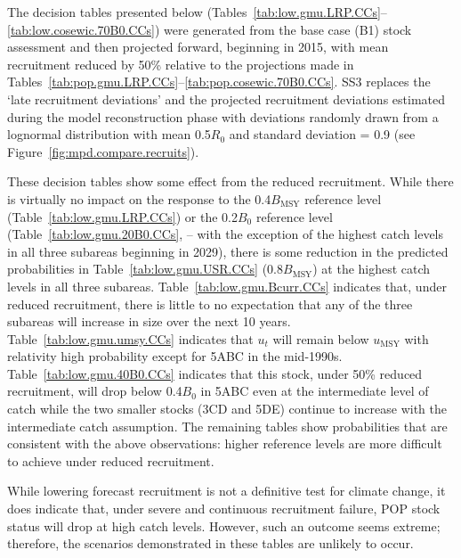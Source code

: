 \documentclass[11pt]{book}
\newcommand{\Bmsy}{B_\text{MSY}}
\newcommand{\umsy}{u_\text{MSY}}
\newcommand{\pc}{\%}
\begin{document}
The decision tables presented below (Tables~\ref{tab:low.gmu.LRP.CCs}--\ref{tab:low.cosewic.70B0.CCs}) were generated from the base case (B1) stock assessment and then projected forward, beginning in 2015, with mean recruitment reduced by 50\pc{} relative to the projections made in Tables~\ref{tab:pop.gmu.LRP.CCs}--\ref{tab:pop.cosewic.70B0.CCs}. 
SS3 replaces the `late recruitment deviations' and the projected recruitment deviations estimated during the model reconstruction phase with deviations randomly drawn from a lognormal distribution with mean 0.5$R_0$ and standard deviation = 0.9 (see Figure~\ref{fig:mpd.compare.recruits}).

These decision tables show some effect from the reduced recruitment.
While there is virtually no impact on the response to the 0.4$\Bmsy$ reference level (Table~\ref{tab:low.gmu.LRP.CCs}) or the 0.2$B_0$ reference level (Table~\ref{tab:low.gmu.20B0.CCs}, -- with the exception of the highest catch levels in all three subareas beginning in 2029), there is some reduction in the predicted probabilities in Table~\ref{tab:low.gmu.USR.CCs} (0.8$\Bmsy$) at the highest catch levels in all three subareas.
Table~\ref{tab:low.gmu.Bcurr.CCs} indicates that, under reduced recruitment, there is little to no expectation that any of the three subareas will increase in size over the next 10 years. 
Table~\ref{tab:low.gmu.umsy.CCs} indicates that $u_t$ will remain below $\umsy$ with relativity high probability except for 5ABC in the mid-1990s. 
Table~\ref{tab:low.gmu.40B0.CCs} indicates that this stock, under 50\pc{} reduced recruitment, will drop below 0.4$B_0$ in 5ABC even at the intermediate level of catch while the two smaller stocks (3CD and 5DE) continue to increase with the intermediate catch assumption.
The remaining tables show probabilities that are consistent with the above observations: higher reference levels are more difficult to achieve under reduced recruitment.

While lowering forecast recruitment is not a definitive test for climate change, it does indicate that, under severe and continuous recruitment failure, POP stock status will drop at high catch levels.
However, such an outcome seems extreme; therefore, the scenarios demonstrated in these tables are unlikely to occur.

\setlength{\tabcolsep}{0pt}%
\renewcommand*{\arraystretch}{1.0}
\end{document}
